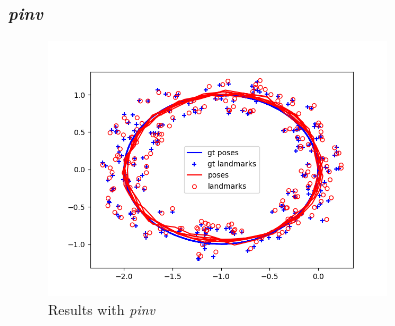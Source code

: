 \documentclass[12pt, a4paper]{article}
\begin{document}
\subsubsection{\textit{pinv}}
\begin{figure}[H]
  \centering
  \includegraphics[width=0.8\textwidth]{./results/linear/pinv_2d_linear_loop_map.png}
  \caption{Results with \textit{pinv}}
\end{figure}
\end{document}
